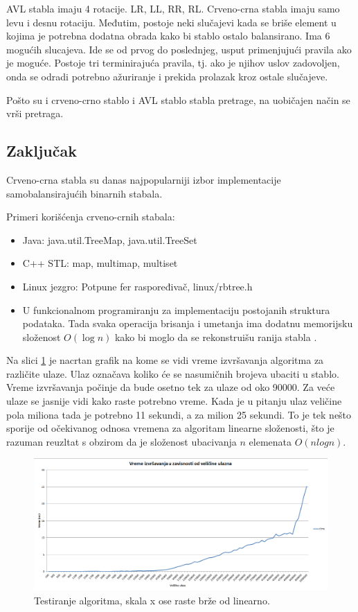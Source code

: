 \documentclass[a4paper]{article}
\begin{document}
    AVL stabla imaju 4 rotacije. LR, LL, RR, RL.
    Crveno-crna stabla imaju samo levu i desnu rotaciju. Međutim, postoje neki slučajevi kada se briše element u kojima je potrebna dodatna obrada
    kako bi stablo ostalo balansirano.
    Ima 6 mogućih slucajeva. Ide se od prvog do poslednjeg, usput primenjujući pravila ako je moguće. Postoje tri terminirajuća pravila, tj. 
    ako je njihov uslov zadovoljen, onda se odradi potrebno ažuriranje i prekida prolazak kroz ostale slučajeve.
    
    Pošto su i crveno-crno stablo i AVL stablo stabla pretrage, na uobičajen način se vrši pretraga.

\subsection{Zaključak}
Crveno-crna stabla su danas najpopularniji izbor implementacije samobalansirajućih binarnih stabala.

Primeri korišćenja crveno-crnih stabala:
\begin{itemize}
    \item  Java: java.util.TreeMap, java.util.TreeSet
    \item C++ STL: map, multimap, multiset \cite{gcc}
    \item Linux jezgro: Potpune fer raspoređivač, linux/rbtree.h
    \item U funkcionalnom programiranju za implementaciju postojanih struktura podataka. Tada svaka operacija brisanja i umetanja ima dodatnu memorijsku složenost $O(\log n)$ kako bi moglo da se rekonstruišu ranija stabla \cite{persistent}.
\end{itemize}

Na slici \ref{fig:chart} je nacrtan grafik na kome se vidi vreme  izvršavanja algoritma za različite ulaze.
Ulaz označava koliko će se nasumičnih brojeva ubaciti u stablo.
Vreme izvršavanja počinje da bude osetno tek za ulaze od oko 90000.
Za veće ulaze se jasnije vidi kako raste potrebno vreme. Kada je u pitanju
ulaz veličine pola miliona tada je potrebno 11 sekundi, a za milion 25 sekundi.
To je tek nešto sporije od očekivanog odnosa vremena za algoritam linearne složenosti, što je 
razuman reuzltat s obzirom da je složenost ubacivanja $n$ elemenata $O(n logn)$.

\begin{figure}
    \includegraphics[width=\textwidth]{chart.png}
    \caption{Testiranje algoritma, skala x ose raste brže od linearno.}
    \label{fig:chart}
\end{figure}

\appendix
 

\end{document}
